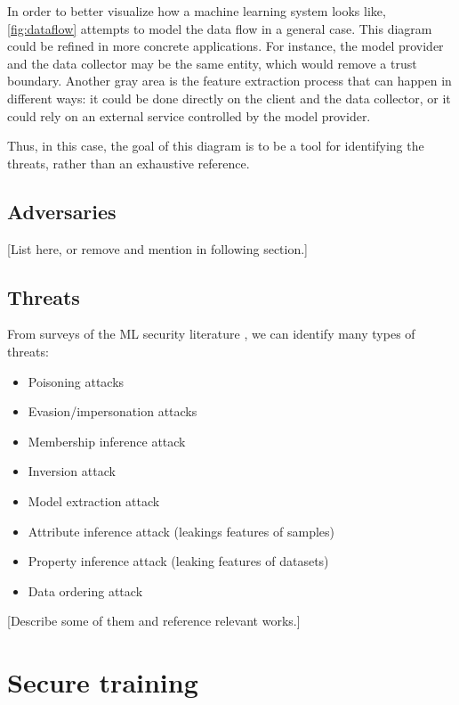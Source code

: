 \documentclass[a4paper,11pt,oneside]{report}
\begin{document}
In order to better visualize how a machine learning system looks like, \autoref{fig:dataflow} attempts to model the data flow in a general case. This diagram could be refined in more concrete applications. For instance, the model provider and the data collector may be the same entity, which would remove a trust boundary. Another gray area is the feature extraction process that can happen in different ways: it could be done directly on the client and the data collector, or it could rely on an external service controlled by the model provider.

Thus, in this case, the goal of this diagram is to be a tool for identifying the threats, rather than an exhaustive reference.

\subsection{Adversaries}

[List here, or remove and mention in following section.]

\subsection{Threats}

From surveys of the ML security literature \cite{liu_survey_2018, rigaki_survey_2021}, we can identify many types of threats:


\begin{itemize}
    \item Poisoning attacks
    \item Evasion/impersonation attacks
    \item Membership inference attack
    \item Inversion attack
    \item Model extraction attack
    \item Attribute inference attack (leakings features of samples)
    \item Property inference attack (leaking features of datasets)
    \item Data ordering attack
\end{itemize}

[Describe some of them and reference relevant works.]

\section{Secure training}\label{sec:secure_training}
\end{document}

